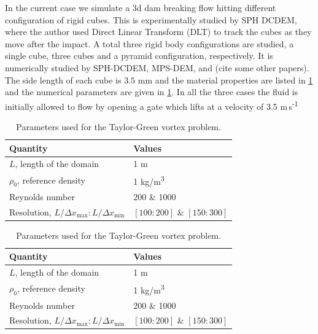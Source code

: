 \documentclass[preprint,12pt]{elsarticle}
\begin{document}
In the current case we simulate a 3d dam breaking flow hitting different
configuration of rigid cubes. This is experimentally studied by SPH DCDEM,
where the author used Direct Linear Transform (DLT) to track the cubes as they
move after the impact. A total three rigid body configurations are studied, a
single cube, three cubes and a pyramid configuration, respectively. It is
numerically studied by SPH-DCDEM, MPS-DEM, and (cite some other papers). The
side length of each cube is $3.5$ mm and the material properties are listed in
\cref{tab:material-properties-3d-dam-breaking-flow-hitting-cubes} and the
numerical parameters are given in
\cref{tab:material-properties-3d-dam-breaking-flow-hitting-cubes}. In all the
three cases the fluid is initially allowed to flow by opening a gate which
lifts at a velocity of 3.5 m\,s\textsuperscript{-1}

\begin{table}[!ht]
  \centering
  \begin{tabular}[!ht]{ll}
    \toprule
    Quantity & Values\\
    \midrule
    $L$, length of the domain & 1 m \\
    $\rho_0$, reference density & 1 kg/m\textsuperscript{3} \\
    Reynolds number & 200 \& 1000 \\
    Resolution, $L/\Delta x_{\max} : L/\Delta x_{\min}$ & $[100:200]$ \& $[150:300]$\\
    \bottomrule
  \end{tabular}
  \caption{Parameters used for the Taylor-Green vortex problem.}%
  \label{tab:material-properties-3d-dam-breaking-flow-hitting-cubes}
\end{table}

\begin{table}[!ht]
  \centering
  \begin{tabular}[!ht]{ll}
    \toprule
    Quantity & Values\\
    \midrule
    $L$, length of the domain & 1 m \\
    $\rho_0$, reference density & 1 kg/m\textsuperscript{3} \\
    Reynolds number & 200 \& 1000 \\
    Resolution, $L/\Delta x_{\max} : L/\Delta x_{\min}$ & $[100:200]$ \& $[150:300]$\\
    \bottomrule
  \end{tabular}
  \caption{Parameters used for the Taylor-Green vortex problem.}%
  \label{tab:numerical-properties-3d-dam-breaking-flow-hitting-cubes}
\end{table}
\end{document}
